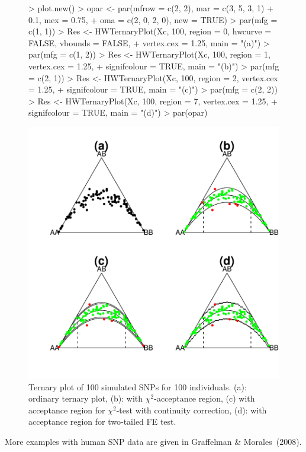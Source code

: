 \documentclass[a4paper]{article}
\begin{document}
\begin{figure}[htb]
\centering
\begin{Schunk}
\begin{Sinput}
> plot.new()
> opar <- par(mfrow = c(2, 2), mar = c(3, 5, 3, 1) + 0.1, mex = 0.75, 
+     oma = c(2, 0, 2, 0), new = TRUE)
> par(mfg = c(1, 1))
> Res <- HWTernaryPlot(Xc, 100, region = 0, hwcurve = FALSE, vbounds = FALSE, 
+     vertex.cex = 1.25, main = "(a)")
> par(mfg = c(1, 2))
> Res <- HWTernaryPlot(Xc, 100, region = 1, vertex.cex = 1.25, 
+     signifcolour = TRUE, main = "(b)")
> par(mfg = c(2, 1))
> Res <- HWTernaryPlot(Xc, 100, region = 2, vertex.cex = 1.25, 
+     signifcolour = TRUE, main = "(c)")
> par(mfg = c(2, 2))
> Res <- HWTernaryPlot(Xc, 100, region = 7, vertex.cex = 1.25, 
+     signifcolour = TRUE, main = "(d)")
> par(opar)
\end{Sinput}
\end{Schunk}
\includegraphics{HardyWeinberg-008}
\caption{Ternary plot of 100 simulated SNPs for 100 individuals. (a): ordinary ternary plot, (b): with $\chi^2$-acceptance
region, (c) with acceptance region for $\chi^2$-test with continuity correction, (d): with acceptance region for two-tailed
FE test.}
\end{figure}
More examples with human SNP data are given in Graffelman \& Morales~(2008).
\end{document}
